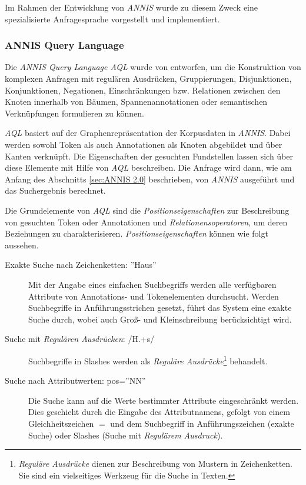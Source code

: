 Im Rahmen der Entwicklung von \emph{ANNIS} wurde zu diesem Zweck eine spezialisierte Anfragesprache vorgestellt und implementiert.

\subsubsection{ANNIS Query Language}\label{sec:AQL}

Die \emph{ANNIS Query Language AQL} wurde von \cite{dipper2004isis} entworfen, um die Konstruktion von komplexen Anfragen mit regulären Ausdrücken, Gruppierungen, Disjunktionen, Konjunktionen, Negationen, Einschränkungen bzw. Relationen zwischen den Knoten innerhalb von Bäumen, Spannenannotationen oder semantischen Verknüpfungen formulieren zu können.

\emph{AQL} basiert auf der Graphenrepräsentation der Korpusdaten in \emph{ANNIS}. Dabei werden sowohl Token als auch Annotationen als Knoten abgebildet und über Kanten verknüpft. Die Eigenschaften der gesuchten Fundstellen lassen sich über diese Elemente mit Hilfe von \emph{AQL} beschreiben. Die Anfrage wird dann, wie am Anfang des Abschnitts \ref{sec:ANNIS 2.0} beschrieben, von \emph{ANNIS} ausgeführt und das Suchergebnis berechnet.

Die Grundelemente von \emph{AQL} sind die \emph{Positionseigenschaften} zur Beschreibung von gesuchten Token oder Annotationen und \emph{Relationensoperatoren}, um deren Beziehungen zu charakterisieren. \emph{Positionseigenschaften} können wie folgt aussehen.

\begin{description}
	\item[Exakte Suche nach Zeichenketten: ''Haus'']{Mit der Angabe eines einfachen Suchbegriffs werden alle verfügbaren Attribute von Annotations- und Tokenelementen durchsucht. Werden Suchbegriffe in Anführungsstrichen gesetzt, führt das System eine exakte Suche durch, wobei auch Groß- und Kleinschreibung berücksichtigt wird.}
	\item[Suche mit \emph{Regulären Ausdrücken}: /H.+s/]{Suchbegriffe in Slashes werden als \emph{Reguläre Ausdrücke}\footnote{\emph{Reguläre Ausdrücke} dienen zur Beschreibung von Mustern in Zeichenketten. Sie sind ein vielseitiges Werkzeug für die Suche in Texten.} behandelt.}
	\item[Suche nach Attributwerten: pos=''NN'']{Die Suche kann auf die Werte bestimmter Attribute eingeschränkt werden. Dies geschieht durch die Eingabe des Attributnamens, gefolgt von einem Gleichheitszeichen $=$ und dem Suchbegriff in Anführungszeichen (exakte Suche) oder Slashes (Suche mit \emph{Regulärem Ausdruck})}.
\end{description}


